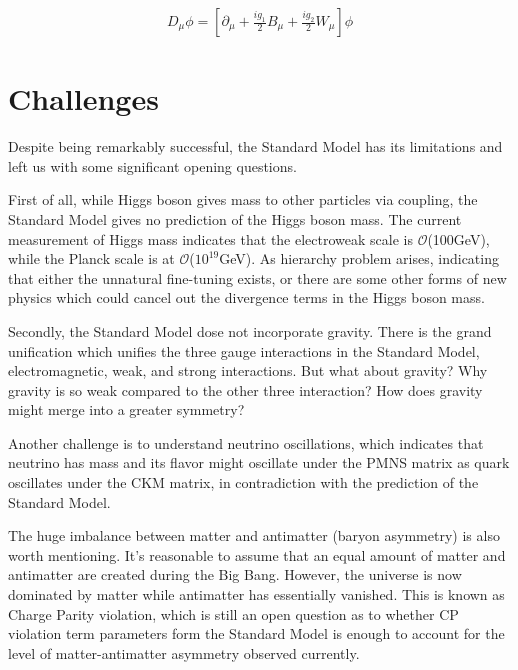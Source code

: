 \begin{equation}
  \begin{aligned}
  D_{\mu}\phi = [\partial_{\mu}+\frac{ig_{1}}{2}B_{\mu}+\frac{ig_{2}}{2}W_{\mu}]\phi
  \end{aligned}
  \label{eq:c1Standard Modelldh}
\end{equation}

\section{Challenges}
\par Despite being remarkably successful, the Standard Model has its limitations and left us with some significant opening questions.

\par First of all, while Higgs boson gives mass to other particles via coupling, the Standard Model gives no prediction of the Higgs boson mass. The current measurement of Higgs mass indicates that the electroweak scale is $\mathcal{O}$(100GeV), while the Planck scale is at $\mathcal{O}$($10^{19}$GeV). As hierarchy problem arises, indicating that either the unnatural fine-tuning exists, or there are some other forms of new physics which could cancel out the divergence terms in the Higgs boson mass.

\par Secondly, the Standard Model dose not incorporate gravity. There is the grand unification which unifies the three gauge interactions in the Standard Model, electromagnetic, weak, and strong interactions. But what about gravity? Why gravity is so weak compared to the other three interaction? How does gravity might merge into a greater symmetry?

\par Another challenge is to understand neutrino oscillations, which indicates that neutrino has mass and its flavor might oscillate under the PMNS matrix as quark oscillates under the CKM matrix, in contradiction with the prediction of the Standard Model.

\par The huge imbalance between matter and antimatter (baryon asymmetry) is also worth mentioning. It's reasonable to assume that an equal amount of matter and antimatter are created during the Big Bang. However, the universe is now dominated by matter while antimatter has essentially vanished. This is known as Charge Parity violation, which is still an open question as to whether CP violation term parameters form the Standard Model is enough to account for the level of matter-antimatter asymmetry observed currently.

